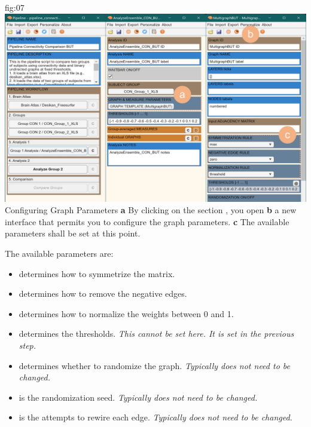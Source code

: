 \documentclass[justified]{tufte-handout}
\begin{document}
{fig:07}
{
	\includegraphics{fig07.jpg}
}
{Configuring Graph Parameters}
{
	{\bf a} By clicking on the section , you open {\bf b} a new interface that permits you to configure the graph parameters.
	{\bf c} The available parameters shall be set at this point.
}


The available parameters are:
\begin{itemize}

\item {} determines how to symmetrize the matrix.

\item {} determines how to remove the negative edges.

\item {} determines how to normalize the weights between 0 and 1.

\item {} determines the thresholds. \emph{This cannot be set here. It is set in the previous step.}

\item {} determines whether to randomize the graph. \emph{Typically does not need to be changed.}

\item {} is the randomization seed. \emph{Typically does not need to be changed.}

\item {} is the attempts to rewire each edge. \emph{Typically does not need to be changed.}

\end{itemize}
\end{document}

